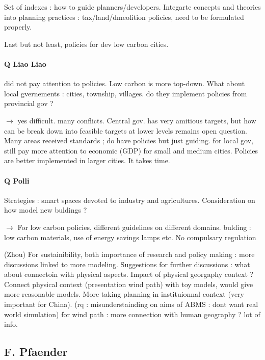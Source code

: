 \documentclass[11pt]{article}
\begin{document}
Set of indexes : how to guide planners/developers. Integarte concepts and theories into planning practices : tax/land/dmeolition policies, need to be formulated properly.

Last but not least, policies for dev low carbon cities.

\paragraph{Q Liao Liao}

did not pay attention to policies. Low carbon is more top-down. What about local gvernements : cities, township, villages.
do they implement policies from provincial gov ?

$\rightarrow$ yes difficult. many conflicts. Central gov. has very amitious targets, but how can be break down into feasible targets at lower levels remains open question. Many areas received standards ; do have policies but just guiding. for local gov, still pay more attention to economic (GDP) for small and medium cities. Policies are better implemented in larger cities. It takes time.

\paragraph{Q Polli}

Strategies : smart spaces devoted to industry and agricultures. Consideration on how model new buldings ?

$\rightarrow$ For low carbon policies, different guidelines on different domains. bulding : low carbon materials, use of energy savings lamps etc. No compulsary regulation


(Zhou) For sustainibility, both importance of research and policy making : more discussions linked to more modeling. Suggestions for further discussions : what about connectoin with physical aspects. Impact of physical georgaphy context ? Connect physical context (presentation wind path) with toy models, would give more reasonable models. More taking planning in instituionnal context (very important for China).
(rq : misunderstainding on aims of ABMS : dont want real world simulation)
for wind path : more connection with human geography ?
lot of info.




\subsection*{F. Pfaender}
\end{document}
